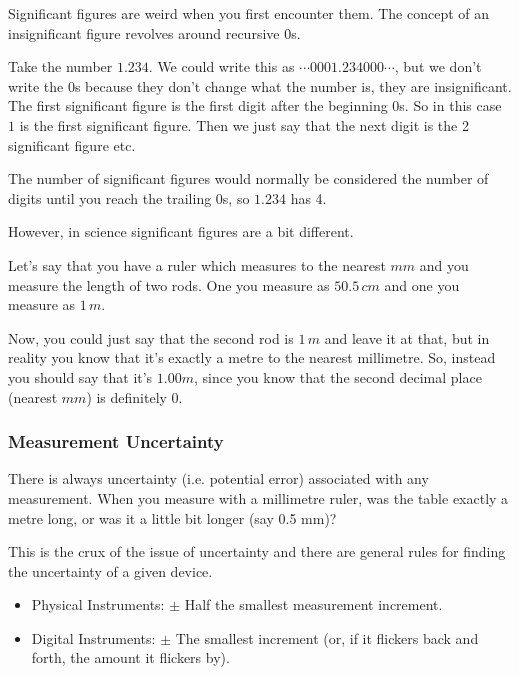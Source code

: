 \documentclass[main.tex]{subfiles}
\begin{document}
                    Significant figures are weird when you first encounter them. The concept of an insignificant figure revolves around recursive 0s.

                    Take the number $1.234$. We could write this as $\cdots 0001.234000 \cdots$, but we don't write the 0s because they don't change what the number is, they are insignificant.
                    The first significant figure is the first digit after the beginning 0s. So in this case $1$ is the first significant figure. Then we just say that the next digit is the 2 significant figure etc.

                    The number of significant figures would normally be considered the number of digits until you reach the trailing 0s, so $1.234$ has 4.

                    However, in science significant figures are a bit different.

                    Let's say that you have a ruler which measures to the nearest $mm$ and you measure the length of two rods. One you measure as $50.5\, cm$ and one you measure as $1\,m$.

                    Now, you could just say that the second rod is $1\,m$ and leave it at that, but in reality you know that it's exactly a metre to the nearest millimetre. So, instead you should say that it's $1.00m$, since you know that the second decimal place (nearest $mm$) is definitely 0.

                    \subsubsection{Measurement Uncertainty}
                        \label{subsubsec: Measurement Uncertainty}

                        There is always uncertainty (i.e. potential error) associated with any measurement. When you measure with a millimetre ruler, was the table exactly a metre long, or was it a little bit longer (say 0.5 mm)?

                        This is the crux of the issue of uncertainty and there are general rules for finding the uncertainty of a given device.
                        \begin{itemize}
                            \item Physical Instruments: $\pm$ Half the smallest measurement increment.
                            \item Digital Instruments: $\pm$ The smallest increment (or, if it flickers back and forth, the amount it flickers by).
                        \end{itemize}
                        
\end{document}
